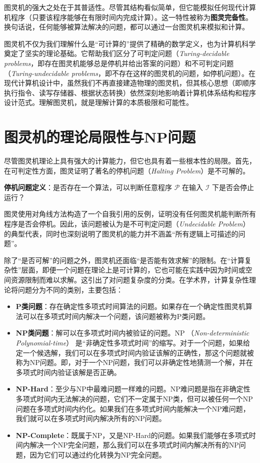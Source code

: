 \documentclass[UTF8,openany,zihao=5]{ctexbook}
\begin{document}
图灵机的强大之处在于其普适性。尽管其结构看似简单，但它能模拟任何现代计算机程序（只要该程序能够在有限时间内完成计算）。这一特性被称为\textbf{图灵完备性}。换句话说，任何能够被算法解决的问题，都可以通过一台图灵机来模拟和计算。

图灵机不仅为我们理解什么是“可计算的”提供了精确的数学定义，也为计算机科学奠定了坚实的理论基础。它帮助我们区分了可判定问题（\textit{Turing-decidable problems}，即存在图灵机能够总是停机并给出答案的问题）和不可判定问题（\textit{Turing-undecidable problems}，即不存在这样的图灵机的问题，如停机问题）。在现代计算机设计中，虽然我们不再直接建造物理的图灵机，但其核心思想（即顺序执行指令、读写存储器、根据状态转换）依然深刻地影响着计算机体系结构和程序设计范式。理解图灵机，就是理解计算的本质极限和可能性。

\section{图灵机的理论局限性与NP问题}

尽管图灵机理论上具有强大的计算能力，但它也具有着一些根本性的局限。首先，在可判定性方面，图灵证明了著名的停机问题（\textit{Halting Problem}）是不可解的。

\textbf{停机问题定义}：是否存在一个算法，可以判断任意程序 $\mathcal{P}$ 在输入 $\mathcal{I}$ 下是否会停止运行？

图灵使用对角线方法构造了一个自我引用的反例，证明没有任何图灵机能判断所有程序是否会停机\cite{turing1936computable}。因此，该问题被认为是不可判定问题（\textit{Undecidable Problem}）的典型代表，同时也深刻说明了图灵机的能力并不涵盖“所有逻辑上可描述的问题”。

除了“是否可解”的问题之外，图灵机还面临“是否能有效求解”的限制。在“计算复杂性”层面，即便一个问题在理论上是可计算的，它也可能在实践中因为时间或空间资源限制而难以求解。这引出了对问题复杂度的分类。在学术界，计算复杂性理论将问题分为不同的类别，主要包括：

\begin{itemize}[noitemsep]
    \item \textbf{P类问题}：存在确定性多项式时间算法的问题。如果存在一个确定性图灵机算法可以在多项式时间内解决一个问题，该问题被称为P类问题。
    \item \textbf{NP类问题}：解可以在多项式时间内被验证的问题。NP （\textit{Non-deterministic Polynomial-time}） 是“非确定性多项式时间”的缩写。对于一个问题，如果给定一个候选解，我们可以在多项式时间内验证该解的正确性，那这个问题就被称为NP问题。即，对于一个NP问题，我们可以非确定性地猜测一个解，并在多项式时间内验证该解是否正确。
    \item \textbf{NP-Hard}：至少与NP中最难问题一样难的问题。NP难问题是指在非确定性多项式时间内无法解决的问题，它们不一定属于NP类，但可以被任何一个NP问题在多项式时间内约化。如果我们在多项式时间内能解决一个NP难问题，我们就可以在多项式时间内解决所有的NP问题。
    \item \textbf{NP-Complete}：既属于NP，又是NP-Hard的问题。如果我们能够在多项式时间内解决一个NP完全问题，那么我们可以在多项式时间内解决所有的NP问题，因为它们可以通过约化转换为NP完全问题。
\end{itemize}
\end{document}
